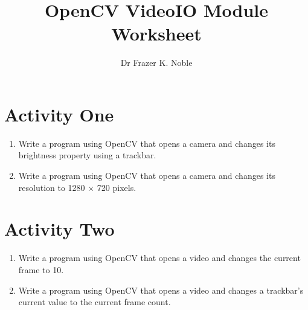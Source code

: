 \documentclass[12pt, A4]{article}
\title{OpenCV VideoIO Module Worksheet}
\author{Dr Frazer K. Noble}
\date{}
\begin{document}
\maketitle

\section*{Activity One}

\begin{enumerate}[label=(\alph*)]

    \item Write a program using OpenCV that opens a camera and changes its brightness property using a trackbar.

    \item Write a program using OpenCV that opens a camera and changes its resolution to 1280 $\times$ 720 pixels.

\end{enumerate}

\section*{Activity Two}

\begin{enumerate}[label=(\alph*)]

    \item Write a program using OpenCV that opens a video and changes the current frame to 10.

    \item Write a program using OpenCV that opens a video and changes a trackbar's current value to the current frame count.

\end{enumerate}
\end{document}
